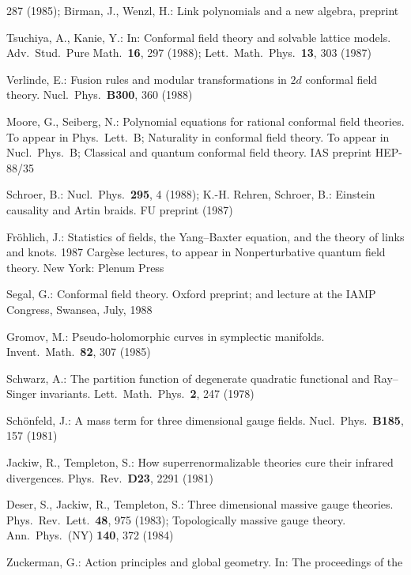 \documentclass[11pt,a4paper]{article}
\begin{document}
\begin{enumerate}[label={[\arabic*]}, leftmargin=2.4em, labelsep=0.5em, align=left]
          287 (1985); Birman, J., Wenzl, H.: Link polynomials and a new algebra, preprint
    \item Tsuchiya, A., Kanie, Y.: In: Conformal field theory and solvable lattice models.
          Adv.\ Stud.\ Pure Math.\ \textbf{16}, 297 (1988); Lett.\ Math.\ Phys.\ \textbf{13},
          303 (1987)
    \item Verlinde, E.: Fusion rules and modular transformations in $2d$ conformal field theory.
          Nucl.\ Phys.\ \textbf{B300}, 360 (1988)
    \item Moore, G., Seiberg, N.: Polynomial equations for rational conformal field theories.
          To appear in Phys.\ Lett.\ B; Naturality in conformal field theory. To appear in
          Nucl.\ Phys.\ B; Classical and quantum conformal field theory. IAS preprint HEP-88/35
    \item Schroer, B.: Nucl.\ Phys.\ \textbf{295}, 4 (1988); K.-H. Rehren, Schroer, B.:
          Einstein causality and Artin braids. FU preprint (1987)
    \item Fr\"ohlich, J.: Statistics of fields, the Yang--Baxter equation, and the theory of
          links and knots. 1987 Carg\`ese lectures, to appear in Nonperturbative quantum field
          theory. New York: Plenum Press
    \item Segal, G.: Conformal field theory. Oxford preprint; and lecture at the IAMP Congress,
          Swansea, July, 1988
    \item Gromov, M.: Pseudo-holomorphic curves in symplectic manifolds.
          Invent.\ Math.\ \textbf{82}, 307 (1985)
    \item Schwarz, A.: The partition function of degenerate quadratic functional and
          Ray--Singer invariants. Lett.\ Math.\ Phys.\ \textbf{2}, 247 (1978)
    \item Sch\"onfeld, J.: A mass term for three dimensional gauge fields.
          Nucl.\ Phys.\ \textbf{B185}, 157 (1981)
    \item Jackiw, R., Templeton, S.: How superrenormalizable theories cure their infrared
          divergences. Phys.\ Rev.\ \textbf{D23}, 2291 (1981)
    \item Deser, S., Jackiw, R., Templeton, S.: Three dimensional massive gauge theories.
          Phys.\ Rev.\ Lett.\ \textbf{48}, 975 (1983); Topologically massive gauge theory.
          Ann.\ Phys.\ (NY) \textbf{140}, 372 (1984)
    \item Zuckerman, G.: Action principles and global geometry. In: The proceedings of the

\end{enumerate}
\end{document}
